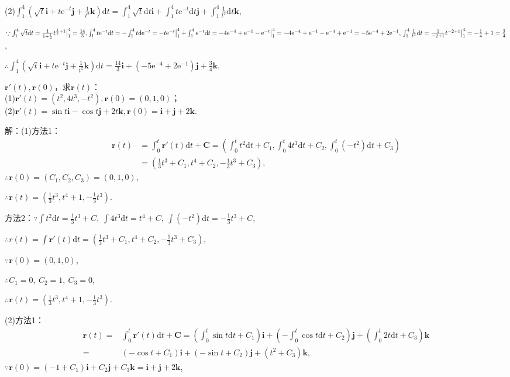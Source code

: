 \documentclass[12pt,UTF8]{ctexart}
\begin{document}
\begin{enumerate}
(2)$\int_1^4(\sqrt t\bm i+t\mathrm e^{-t}\bm j+\frac1{t^2}\bm k)\mathrm dt=\int_1^4\sqrt t\mathrm dt\bm i+\int_1^4t\mathrm e^{-t}\mathrm dt\bm j+\int_1^4\frac1{t^2}\mathrm dt\bm k$,

$\because\int_1^4\sqrt t\mathrm dt=\frac1{1+\frac12}t^{\frac12+1}\big|_1^4=\frac{14}3,\int_1^4t\mathrm e^{-t}\mathrm dt=-\int_1^4t\mathrm d\mathrm e^{-t}=-t\mathrm e^{-t}\big|_1^4+\int_1^4\mathrm e^{-t}\mathrm dt\\
=-4\mathrm e^{-4}+\mathrm e^{-1}-\mathrm e^{-t}\big|_1^4=-4\mathrm e^{-4}+\mathrm e^{-1}-\mathrm e^{-4}+\mathrm e^{-1}=-5\mathrm e^{-4}+2\mathrm e^{-1},\\
\int_1^4\frac1{t^2}\mathrm dt=\frac1{-2+1}t^{-2+1}\big|_1^4=-\frac14+1=\frac34$,

$\therefore\int_1^4(\sqrt t\bm i+t\mathrm e^{-t}\bm j+\frac1{t^2}\bm k)\mathrm dt=\frac{14}3\bm i+(-5\mathrm e^{-4}+2\mathrm e^{-1})\bm j+\frac34\bm k$.

$\bm r'(t),\bm r(0)$，求$\bm r(t)$：\\
(1)$\bm r'(t)=(t^2,4t^3,-t^2),\bm r(0)=(0,1,0)$；\\
(2)$\bm r'(t)=\sin t\bm i-\cos t\bm j+2t\bm k,\bm r(0)=\bm i+\bm j+2\bm k$.

解：(1)方法1：
\[\begin{split}
\bm r(t)&=\int_0^t\bm r'(t)\mathrm dt+\bm C=(\int_0^tt^2\mathrm dt+C_1,\int_0^t4t^3\mathrm dt+C_2,\int_0^t(-t^2)\mathrm dt+C_3)\\
&=(\frac13t^3+C_1,t^4+C_2,-\frac13t^3+C_3),
\end{split}\]
$\therefore\bm r(0)=(C_1,C_2,C_3)=(0,1,0)$,

$\therefore\bm r(t)=(\frac13t^3,t^4+1,-\frac13t^3)$.

方法2：$\because\int t^2\mathrm dt=\frac13t^3+C,\ \int4t^3\mathrm dt=t^4+C,\ \int(-t^2)\mathrm dt=-\frac13t^3+C$,

$\therefore r(t)=\int\bm r'(t)\mathrm dt=(\frac13t^3+C_1,t^4+C_2,-\frac13t^3+C_3)$,

$\because\bm r(0)=(0,1,0)$,

$\therefore C_1=0,\ C_2=1,\ C_3=0$,

$\therefore\bm r(t)=(\frac13t^3,t^4+1,-\frac13t^3)$.

(2)方法1：\[\begin{split}
\bm r(t)=&\int_0^t\bm r'(t)\mathrm dt+\bm C=(\int_0^t\sin t\mathrm dt+C_1)\bm i+(-\int_0^t\cos t\mathrm dt+C_2)\bm j+(\int_0^t2t\mathrm dt+C_3)\bm k\\
=&(-\cos t+C_1)\bm i+(-\sin t+C_2)\bm j+(t^2+C_3)\bm k,
\end{split}\]
$\because\bm r(0)=(-1+C_1)\bm i+C_2\bm j+C_3\bm k=\bm i+\bm j+2\bm k$,


\end{enumerate}
\end{document}
